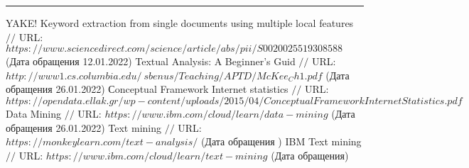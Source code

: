 \makeatletter \renewcommand{} \makeatother
\renewcommand\refname{Список использованных источников}
\begin{thebibliography}{00}
	
	
	
	\hrule
	
	
	YAKE! Keyword extraction from single documents using multiple local features $//$ URL: $https://www.sciencedirect.com/science/article/abs/pii/S0020025519308588$ (Дата обращения 12.01.2022)
	Textual Analysis: A Beginner's Guid  $//$ URL: $http://www1.cs.columbia.edu/~sbenus/Teaching/APTD/McKee_Ch1.pdf$ (Дата обращения 26.01.2022)
	Сonceptual Framework Internet statistics $//$ URL: $https://opendata.ellak.gr/wp-content/uploads/2015/04/ConceptualFrameworkInternetStatistics.pdf$
	Data Mining $//$ URL: $https://www.ibm.com/cloud/learn/data-mining$ (Дата обращения 26.01.2022)
	Text mining $//$ URL: $https://monkeylearn.com/text-analysis/$ (Дата обращения )
	IBM Text mining $//$ URL: $https://www.ibm.com/cloud/learn/text-mining$ (Дата обращения)
\end{thebibliography}
